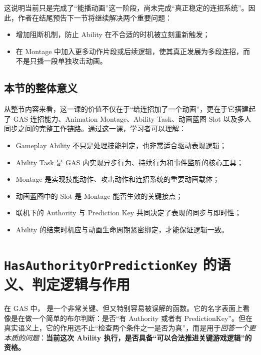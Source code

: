 这说明当前只是完成了“能播动画”这一阶段，尚未完成“真正稳定的连招系统”。因此，作者在结尾预告下一节将继续解决两个重要问题：

\begin{itemize}
	\item 增加阻断机制，防止 Ability 在不合适的时机被立刻重新触发；
	\item 在 Montage 中加入更多动作片段或后续逻辑，使其真正发展为多段连招，而不是只播一段单独攻击动画。
\end{itemize}

\subsection{本节的整体意义}

从整节内容来看，这一课的价值不仅在于“给连招加了一个动画”，更在于它搭建起了 GAS 连招能力、Animation Montage、Ability Task、动画蓝图 Slot 以及多人同步之间的完整工作链路。通过这一课，学习者可以理解：

\begin{itemize}
	\item Gameplay Ability 不只是处理技能判定，也非常适合驱动表现逻辑；
	\item Ability Task 是 GAS 内实现异步行为、持续行为和事件监听的核心工具；
	\item Montage 是实现技能动作、攻击动作和连招系统的重要动画载体；
	\item 动画蓝图中的 Slot 是 Montage 能否生效的关键接点；
	\item 联机下的 Authority 与 Prediction Key 共同决定了表现的同步与即时性；
	\item Ability 的结束时机应与动画生命周期紧密绑定，才能保证逻辑一致。
\end{itemize}






\section{\texttt{HasAuthorityOrPredictionKey} 的语义、判定逻辑与作用}

在 GAS 中， 是一个非常关键、但又特别容易被误解的函数。它的名字表面上看像是在做一个简单的布尔判断：是否“有 Authority 或者有 PredictionKey”。但在真实语义上，它的作用远不止“检查两个条件之一是否为真”，而是用于\emph{回答一个更本质的问题}：\textbf{当前这次 Ability 执行，是否具备“可以合法推进关键游戏逻辑”的资格。}

